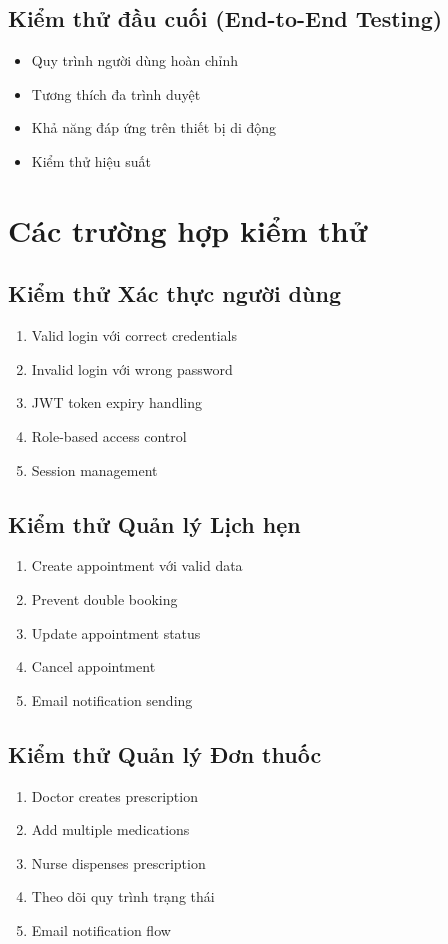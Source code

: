 \documentclass[12pt,a4paper]{report}
\begin{document}
\subsection{Kiểm thử đầu cuối (End-to-End Testing)}
\begin{itemize}
    \item Quy trình người dùng hoàn chỉnh
    \item Tương thích đa trình duyệt
    \item Khả năng đáp ứng trên thiết bị di động
    \item Kiểm thử hiệu suất
\end{itemize}

\section{Các trường hợp kiểm thử}

\subsection{Kiểm thử Xác thực người dùng}
\begin{enumerate}
    \item Valid login với correct credentials
    \item Invalid login với wrong password
    \item JWT token expiry handling
    \item Role-based access control
    \item Session management
\end{enumerate}

\subsection{Kiểm thử Quản lý Lịch hẹn}
\begin{enumerate}
    \item Create appointment với valid data
    \item Prevent double booking
    \item Update appointment status
    \item Cancel appointment
    \item Email notification sending
\end{enumerate}

\subsection{Kiểm thử Quản lý Đơn thuốc}
\begin{enumerate}
    \item Doctor creates prescription
    \item Add multiple medications
    \item Nurse dispenses prescription
    \item Theo dõi quy trình trạng thái
    \item Email notification flow
\end{enumerate}
\end{document}
